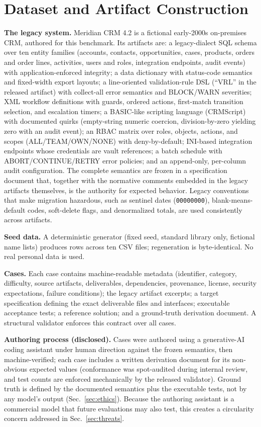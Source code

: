 \documentclass{ieeetj}
\begin{document}
\section{Dataset and Artifact Construction}
\label{sec:dataset}
\textbf{The legacy system.} Meridian CRM 4.2 is a fictional early-2000s on-premises CRM,
authored for this benchmark. Its artifacts are: a legacy-dialect SQL schema over ten entity
families (accounts, contacts, opportunities, cases, products, orders and order lines,
activities, users and roles, integration endpoints, audit events) with application-enforced
integrity; a data dictionary with status-code semantics and fixed-width export layouts; a
line-oriented validation-rule DSL (``VRL'' in the released artifact) with collect-all error
semantics and BLOCK/WARN
severities; XML workflow definitions with guards, ordered actions, first-match transition
selection, and escalation timers; a BASIC-like scripting language (CRMScript) with documented
quirks (empty-string numeric coercion, division-by-zero yielding zero with an audit event);
an RBAC matrix over roles, objects, actions, and scopes (ALL/TEAM/OWN/NONE) with
deny-by-default; INI-based integration endpoints whose credentials are vault references; a
batch schedule with ABORT/CONTINUE/RETRY error policies; and an append-only, per-column audit
configuration. The complete semantics are frozen in a specification document that, together
with the normative comments embedded in the legacy artifacts themselves, is the authority for
expected behavior. Legacy conventions that make migration hazardous, such as
sentinel dates (\texttt{00000000}), blank-means-default codes, soft-delete flags, and
denormalized totals, are used consistently across artifacts.

\textbf{Seed data.} A deterministic generator (fixed seed, standard library only, fictional
name lists) produces \SeedRows{} rows across ten CSV files; regeneration is byte-identical. No real personal
data is used.

\textbf{Cases.} Each case contains machine-readable metadata (identifier, category, difficulty,
source artifacts, deliverables, dependencies, provenance, license, security expectations,
failure conditions); the legacy artifact excerpts; a target specification defining the exact
deliverable files and interfaces; executable acceptance tests; a reference solution; and a
ground-truth derivation document. A structural validator enforces this contract over all
\NumCases{} cases.

\textbf{Authoring process (disclosed).} Cases were authored using a generative-AI coding
assistant under human direction against the frozen semantics, then machine-verified; each
case includes a written derivation document for its non-obvious expected values (conformance
was spot-audited during internal review, and test counts are enforced mechanically by the
released validator). Ground truth is defined by the documented semantics plus the executable
tests, not by any model's output (Sec.~\ref{sec:ethics}). Because the authoring assistant is
a commercial model that future evaluations may also test, this creates a circularity concern
addressed in Sec.~\ref{sec:threats}.
\end{document}
